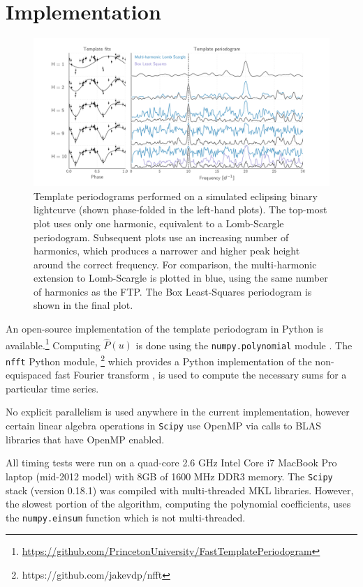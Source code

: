 \documentclass[apj]{emulateapj}
\begin{document}
\section{Implementation}\label{sec:implementation}

\begin{figure}
    \centering
    \includegraphics[width=\textwidth]{plots/templates_and_periodograms.pdf}
    \caption{\label{fig:tempsandpdgs} Template periodograms performed on a simulated eclipsing
            binary lightcurve (shown phase-folded in the left-hand plots). The top-most plot 
            uses only one harmonic, equivalent to a Lomb-Scargle periodogram. Subsequent plots
            use an increasing number of harmonics, which produces a narrower and higher peak
            height around the correct frequency. For comparison, the multi-harmonic extension 
            to Lomb-Scargle is plotted in blue, using the same number of harmonics as the FTP.
            The Box Least-Squares \citep{Kovacs_2002} periodogram is shown in the final plot.}
\end{figure}

An open-source implementation of the template periodogram in Python is
available.\footnote{\url{https://github.com/PrincetonUniversity/FastTemplatePeriodogram}} 
Computing $\hat{P}(u)$ is done using the \texttt{numpy.polynomial} module 
\citep{Scipy}. The \texttt{nfft} Python module,
\footnote{https://github.com/jakevdp/nfft} which provides a Python 
implementation of the non-equispaced fast Fourier transform \citep{NFFT}, 
is used to compute the necessary sums for a particular time series.

No explicit parallelism is used anywhere in the current implementation, 
however certain linear algebra operations in \texttt{Scipy} use OpenMP 
via calls to BLAS libraries that have OpenMP enabled.

All timing tests were run on a quad-core 2.6 GHz Intel Core i7 MacBook 
Pro laptop (mid-2012 model) with 8GB of 1600 MHz DDR3 memory. The \texttt{Scipy} stack 
(version 0.18.1) was compiled with multi-threaded MKL libraries.
However, the slowest portion of the algorithm, computing the polynomial
coefficients, uses the \texttt{numpy.einsum} function which is not
multi-threaded. 
\end{document}
